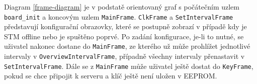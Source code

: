 Diagram \ref{frame-diagram} je v podstatě orientovaný graf s počátečním uzlem \texttt{board\_init}
a koncovým uzlem \texttt{MainFrame}.
\texttt{ClkFrame} a \texttt{SetIntervalFrame} představují konfigurační obrazovky, které se postupně
zobrazí v případě kdy je STM offline nebo je spuštěno poprvé.
Po zadání konfigurace, je-li to nutné, se uživatel nakonec dostane do \texttt{MainFrame}, ze kterého
už může prohlížet jednotlivé intervaly v \texttt{OverviewIntervalFrame}, případně všechny intervaly
přenastavit v \texttt{SetInterval\allowbreak Frame}.
Dále se z \texttt{MainFrame} může uživatel ještě dostat do \texttt{KeyFrame}, pokud se chce připojit
k serveru a klíč ještě není uložen v EEPROM.

